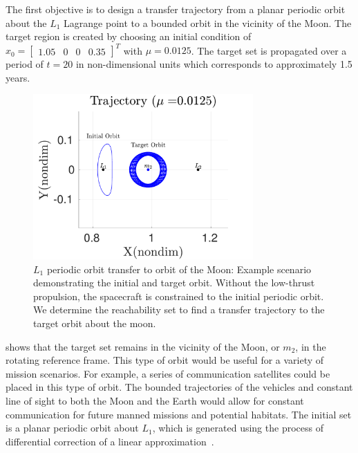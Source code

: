 The first objective is to design a transfer trajectory from a planar periodic orbit about the \( L_1\) Lagrange point to a bounded orbit in the vicinity of the Moon.
The target region is created by choosing an initial condition of \( x_0 = \begin{bmatrix}1.05 & 0 & 0 & 0.35 \end{bmatrix}^T \) with \( \mu = 0.0125 \).
The target set is propagated over a period of \( t = \num{20} \) in non-dimensional units which corresponds to approximately \num{1.5} years.
\begin{figure}[htbp]
   \centering
   \includegraphics[width=0.75\textwidth]{figures/2017_JAS/moon_orbit.pdf} %
   \caption{\(L_1\) periodic orbit transfer to orbit of the Moon: Example scenario demonstrating the initial and target orbit.
   Without the low-thrust propulsion, the spacecraft is constrained to the initial periodic orbit. 
   We determine the reachability set to find a transfer trajectory to the target orbit about the moon.}
   \label{fig:moon_orbit}
\end{figure}
 shows that the target set remains in the vicinity of the Moon, or \( m_2\), in the rotating reference frame. 
This type of orbit would be useful for a variety of mission scenarios.
For example, a series of communication satellites could be placed in this type of orbit. 
The bounded trajectories of the vehicles and constant line of sight to both the Moon and the Earth would allow for constant communication for future manned missions and potential habitats.
The initial set is a planar periodic orbit about \( L_1\), which is generated using the process of differential correction of a linear approximation~\cite{koon2011}.


